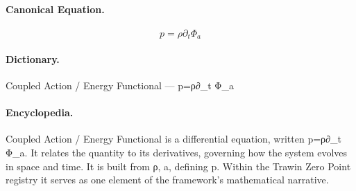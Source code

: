 \paragraph{Canonical Equation.}
\[
p=\rho\partial_t \Phi_a
\]

\paragraph{Dictionary.}
Coupled Action / Energy Functional — p=ρ∂\_t Φ\_a

\paragraph{Encyclopedia.}
Coupled Action / Energy Functional is a differential equation, written p=ρ∂\_t Φ\_a. It relates the quantity to its derivatives, governing how the system evolves in space and time. It is built from ρ, a, defining p. Within the Trawin Zero Point registry it serves as one element of the framework's mathematical narrative.

